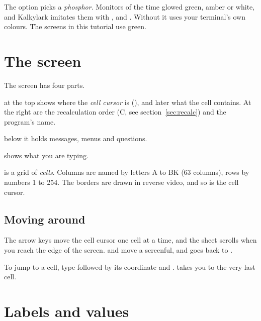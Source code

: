 \documentclass[11pt]{article}
\begin{document}
The  option picks a \emph{phosphor}. Monitors of the time glowed
green, amber or white, and Kalkylark imitates them with ,
 and . Without  it uses your terminal's
own colours. The screens in this tutorial use green.

\section{The screen}


The screen has four parts.

\begin{description}[style=nextline, leftmargin=1.5em]
\item[The status line] at the top shows where the \emph{cell cursor} is
  (), and later what the cell contains. At the right are the
  recalculation order (\textsf{C}, see section~\ref{sec:recalc}) and the
  program's name.
\item[The prompt line] below it holds messages, menus and questions.
\item[The entry line] shows what you are typing.
\item[The sheet] is a grid of \emph{cells}. Columns are named by letters
  \textsf{A} to \textsf{BK} (63 columns), rows by numbers 1 to 254. The
  borders are drawn in reverse video, and so is the cell cursor.
\end{description}

\subsection{Moving around}

The arrow keys move the cell cursor one cell at a time, and the sheet
scrolls when you reach the edge of the screen.  and 
move a screenful, and  goes back to .

To jump to a cell, type \typ{>} followed by its coordinate and \enter.
\enter{} takes you to the very last cell.

\section{Labels and values}
\end{document}
